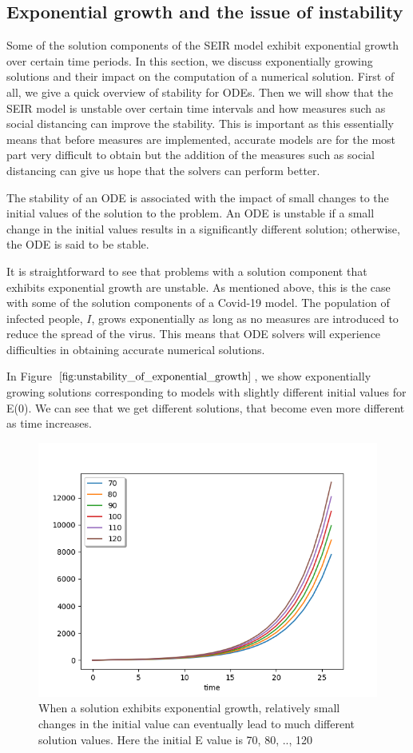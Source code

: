 \subsection{Exponential growth and the issue of instability}
\label{subsection:exponential_growth}
Some of the solution components of the SEIR model exhibit exponential growth over certain time periods. In this section, we discuss exponentially growing solutions and their impact on the computation of a numerical solution. First of all, we give a quick overview of stability for ODEs. Then we will show that the SEIR model is unstable over certain time intervals and how measures such as social distancing can improve the stability. This is important as this essentially means that before measures are implemented, accurate models are for the most part very difficult to obtain but the addition of the measures such as social distancing can give us hope that the solvers can perform better.

The stability of an ODE is associated with the impact of small changes to the initial values of the solution to the problem. An ODE is unstable if a small change in the initial values results in a significantly different solution; otherwise, the ODE is said to be stable.

It is straightforward to see that problems with a solution component that exhibits exponential growth are unstable. As mentioned above, this is the case with some of the solution components of a Covid-19 model. The population of infected people, $I$, grows exponentially as long as no measures are introduced to reduce the spread of the virus. This means that ODE solvers will experience difficulties in obtaining accurate numerical solutions. 

In Figure $\ref{fig:unstability_of_exponential_growth}$, we show exponentially growing solutions corresponding to models with slightly different initial values for E(0). We can see that we get different solutions, that become even more different as time increases.

\begin{figure}[H]
\centering
\includegraphics[width=0.7\linewidth]{./figures/unstability_of_exponential_growth}
\caption{When a solution exhibits exponential growth, relatively small changes in the initial value can eventually lead to much different solution values. Here the initial E value is 70, 80, .., 120}
\label{fig:unstability_of_exponential_growth}
\end{figure}

